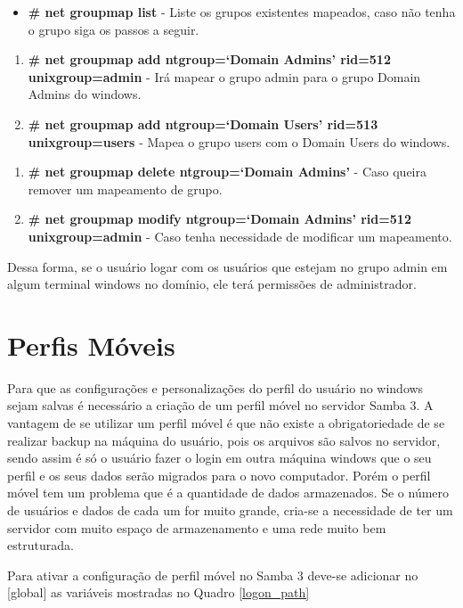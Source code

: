 \begin{itemize}
	\item \textbf{\# net groupmap list} - Liste os grupos existentes mapeados, caso não tenha o grupo siga os passos a seguir.
\end{itemize}
\begin{enumerate}
	\item \textbf{\# net groupmap add ntgroup=`Domain Admins' rid=512 unixgroup=admin} - Irá mapear o grupo admin para o grupo Domain Admins do windows.
	\item \textbf{\# net groupmap add ntgroup=`Domain Users' rid=513 unixgroup=users} - Mapea o grupo users com o Domain Users do windows.
\end{enumerate}

\begin{enumerate}
	\item \textbf{\# net groupmap delete ntgroup=`Domain Admins'} - Caso queira remover um mapeamento de grupo.
	\item \textbf{\# net groupmap modify ntgroup=`Domain Admins' rid=512 unixgroup=admin} - Caso tenha necessidade de modificar um mapeamento.
\end{enumerate}

Dessa forma, se o usuário logar com os usuários que estejam no grupo admin em algum terminal windows no domínio, ele terá permissões de administrador.

\section{Perfis Móveis}

Para que as configurações e personalizações do perfil do usuário no windows sejam salvas é necessário a criação de um perfil móvel no servidor Samba 3. 
A vantagem de se utilizar um perfil móvel é que não existe a obrigatoriedade de se realizar backup na máquina do usuário, pois os arquivos são salvos no servidor, sendo assim é só o usuário fazer o login em outra máquina windows que o seu perfil e os seus dados serão migrados para o novo computador. Porém o perfil móvel tem um problema que é a quantidade de dados armazenados. Se o número de usuários e dados de cada um for muito grande, cria-se a necessidade de ter um servidor com muito espaço de armazenamento e uma rede muito bem estruturada. 

Para ativar a configuração de perfil móvel no Samba 3 deve-se adicionar no [global] as variáveis mostradas no Quadro \ref{logon_path} \\

